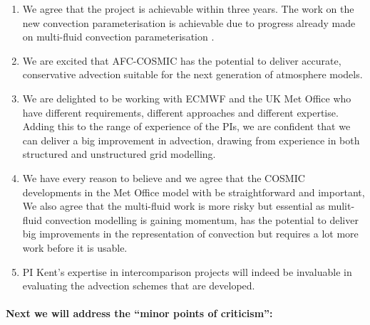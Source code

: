 \begin{enumerate}

\item \label{it:bounded} We agree that the project is achievable within three years. The work on the new convection parameterisation is achievable due to progress already made on multi-fluid convection parameterisation \cite[eg][]{WM19,TWV+18}.

\item \label{it:progression} We are excited that AFC-COSMIC has the potential to deliver accurate, conservative advection suitable for the next generation of atmosphere models.

\item \label{it:partners} We are delighted to be working with ECMWF and the UK Met Office who have different requirements, different approaches and different expertise. Adding this to the range of experience of the PIs, we are confident that we can deliver a big improvement in advection, drawing from experience in both structured and unstructured grid modelling.

\item \label{it:balance} We have every reason to believe and we agree that the COSMIC developments in the Met Office model with be straightforward and important, We also agree that the multi-fluid work is more risky but essential as mulit-fluid convection modelling is gaining momentum, has the potential to deliver big improvements in the representation of convection but requires a lot more work before it is usable. 

\item \label{it:PImips} PI Kent's expertise in intercomparison projects will indeed be invaluable in evaluating the advection schemes that are developed. 

\end{enumerate}

\paragraph*{Next we will address the ``minor points of criticism'':}

